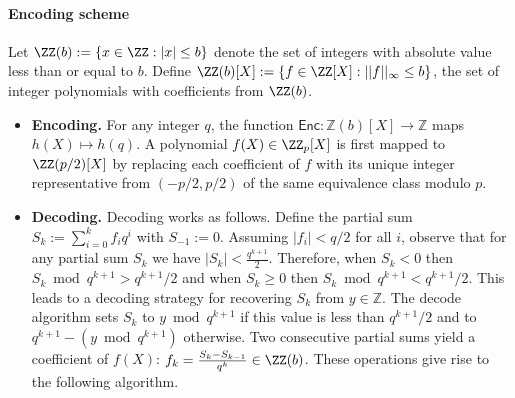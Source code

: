 \paragraph{Encoding scheme} Let $\ZZ(b):=\{x \in \ZZ: \vert x \vert  \leq b\}$ denote the set of integers with absolute value less than or equal to $b$. Define $\ZZ(b)[X] := \{f \in \ZZ[X]: ||f||_\infty \leq b\}$, the set of integer polynomials with coefficients from $\ZZ(b)$. 

\begin{itemize} 

\item \textbf{Encoding.}
For any integer $q$, the function $\mathsf{Enc} : \mathbb{Z}(b)[X] \rightarrow \mathbb{Z}$ maps $h(X) \mapsto h(q)$. A polynomial $f(X) \in \ZZ_p[X]$ is first mapped to $\ZZ(p/2)[X]$ by replacing each coefficient of $f$ with its unique integer representative from $(-p/2,p/2)$ of the same equivalence class modulo $p$.  %

\item \textbf{Decoding.}
Decoding works as follows. Define the partial sum $S_k := \sum_{i=0}^k f_i q^i$ with $S_{-1} := 0$. Assuming $|f_i| < q/2$ for all $i$, observe that for any partial sum $S_k$ we have $|S_k|<\frac{q^{k+1}}{2}$. Therefore, when $S_k < 0$ then $S_k \bmod q^{k+1} > q^{k+1}/2$ and when $S_k \geq 0$ then $S_k \bmod q^{k+1} < q^{k+1}/2$. 
This leads to a decoding strategy for recovering $S_k$ from $y \in \mathbb{Z}$. The decode algorithm sets $S_k$ to $y \bmod q^{k+1}$ if this value is less than $q^{k+1}/2$ and to $q^{k+1}- (y \bmod q^{k+1})$ otherwise.
Two consecutive partial sums yield a coefficient of $f(X)$: $f_k = \frac{S_{k} - S_{k-1}}{q^{k}} \in \ZZ(b)$. These operations give rise to the following algorithm.\\
\end{itemize}

